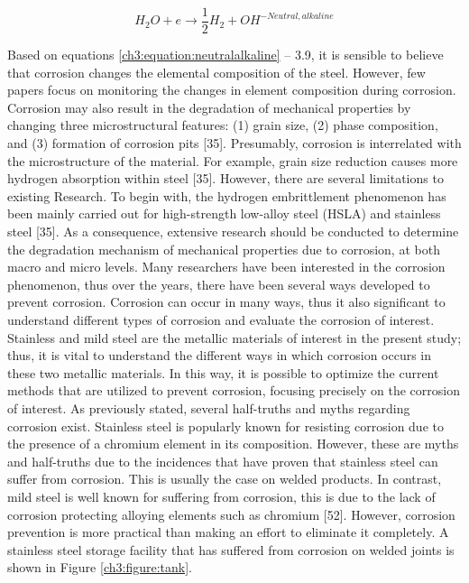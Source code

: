 \documentclass[12pt]{report}
\begin{document}
\begin{equation}
    H_2O + e \rightarrow \frac{1}{2}H_2 + OH^{-Neutral,alkaline}
    \label{ch3:equation:neutralalkaline}
\end{equation}

Based on equations \ref{ch3:equation:neutralalkaline} – 3.9, it is sensible to believe that corrosion changes the elemental composition of the steel. However, few papers focus on monitoring the changes in element composition during corrosion. Corrosion may also result in the degradation of mechanical properties by changing three microstructural features: (1) grain size, (2) phase composition, and (3) formation of corrosion pits [35]. Presumably, corrosion is interrelated with the microstructure of the material. For example, grain size reduction causes more hydrogen absorption within steel [35]. However, there are several limitations to existing Research. To begin with, the hydrogen embrittlement phenomenon has been mainly carried out for high-strength low-alloy steel (HSLA) and stainless steel [35]. As a consequence, extensive research should be conducted to determine the degradation mechanism of mechanical properties due to corrosion, at both macro and micro levels.  
Many researchers have been interested in the corrosion phenomenon, thus over the years, there have been several ways developed to prevent corrosion. Corrosion can occur in many ways, thus it also significant to understand different types of corrosion and evaluate the corrosion of interest. Stainless and mild steel are the metallic materials of interest in the present study; thus, it is vital to understand the different ways in which corrosion occurs in these two metallic materials. In this way, it is possible to optimize the current methods that are utilized to prevent corrosion, focusing precisely on the corrosion of interest.
As previously stated, several half-truths and myths regarding corrosion exist. Stainless steel is popularly known for resisting corrosion due to the presence of a chromium element in its composition. However, these are myths and half-truths due to the incidences that have proven that stainless steel can suffer from corrosion. This is usually the case on welded products. In contrast, mild steel is well known for suffering from corrosion, this is due to the lack of corrosion protecting alloying elements such as chromium [52]. However, corrosion prevention is more practical than making an effort to eliminate it completely. A stainless steel storage facility that has suffered from corrosion on welded joints is shown in Figure \ref{ch3:figure:tank}.
 
\end{document}
